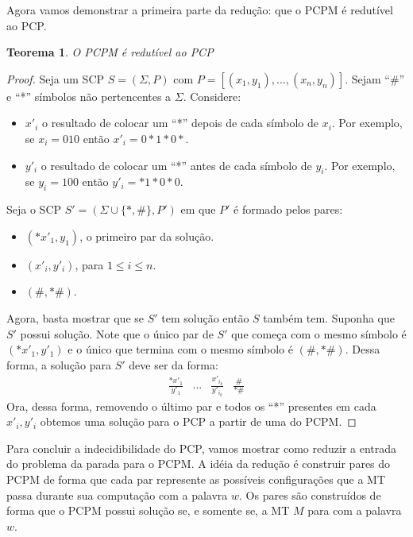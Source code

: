 \documentclass[a4paper]{article}
\newtheorem{Theorem}{Teorema}
\theoremstyle{definition}
\begin{document}
  Agora vamos demonstrar a primeira parte da redução: que o PCPM é redutível ao
  PCP.

  \begin{Theorem}
    O PCPM é redutível ao PCP
  \end{Theorem}
  \begin{proof}
    Seja um SCP $S = (\Sigma, P)$ com $P = [(x_1,y_1),...,(x_n,y_n)]$. Sejam
    ``\#'' e ``*'' símbolos não pertencentes a $\Sigma$. Considere:
    \begin{itemize}
      \item $x'_i$ o resultado de colocar um ``*'' depois de cada símbolo de
        $x_i$. Por exemplo, se $x_i = 010$ então $x'_i = 0*1*0*$.
      \item $y'_i$ o resultado de colocar um ``*'' antes de cada símbolo de
        $y_i$. Por exemplo, se $y_i = 100$ então $y'_i = *1*0*0$.
     \end{itemize}
     Seja o SCP $S' = (\Sigma\cup\{*,\#\},P')$ em que $P'$ é formado pelos
     pares:
     \begin{itemize}
        \item $(*x'_1,y_1)$, o primeiro par da solução.
        \item $(x'_i,y'_i)$, para $1\leq i \leq n$.
        \item $(\#,*\#)$.
     \end{itemize}
     Agora, basta mostrar que se $S'$ tem solução então $S$ também tem. Suponha
     que $S'$ possui solução. Note que o único par de $S'$ que começa com o
     mesmo símbolo é $(*x'_1, y'_1)$ e o único que termina com o mesmo símbolo é
     $(\#,*\#)$. Dessa forma, a solução para $S'$ deve ser da forma:
     \[
       \begin{array}{cccc}
         \frac{*x'_1}{y'_1} &
         ...                & 
         \frac{x'_{i_k}}{y'_{i_k}} & 
         \frac{\#}{*\#}
       \end{array}
     \]
     Ora, dessa forma, removendo o último par e todos os ``*'' presentes em cada
     $x'_i,y'_i$ obtemos uma solução para o PCP a partir de uma do PCPM.
  \end{proof}

  Para concluir a indecidibilidade do PCP, vamos mostrar como reduzir a entrada
  do problema da parada para o PCPM. A idéia da redução é construir pares do
  PCPM de forma que cada par represente as possíveis configurações que a MT
  passa durante sua computação com a palavra $w$. Os pares são construídos de
  forma que o PCPM possui solução se, e somente se, a MT $M$ para com a palavra
  $w$.
\end{document}
